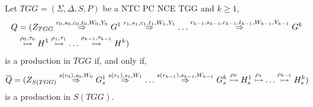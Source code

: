 \begin{theorem}
	\label{thm:one_d_enough_pac}
	Let $TGG = (\Sigma, \Delta, S, P)$ be a NTC PC NCE TGG and $k \ge 1$,
	\begin{align*}
		Q & = (\startTG{TGG} \tderivpac{r_0}{s_0,c_0,t_0}{W_0,Y_0}{} G^1 \tderivpac{r_1}{s_1,c_1,t_1}{W_1,Y_1}{} \dots \tderivpac{r_{k-1}}{s_{k-1},c_{k-1},t_{k-1}}{W_{k-1},Y_{k-1}}{} G^k \\
		& \tresolv{\rho_0,\tau_0} H^1 \tresolv{\rho_1,\tau_1} \dots \tresolv{\rho_{k-1},\tau_{k-1}} H^k)
	\end{align*}
	is a production in $TGG$ if, and only if,
	\begin{equation*}
		\overline{Q} = (\startG{S(TGG)} \derivpac{s(r_0)}{s_0}{W_0}{} G^1_s \derivpac{s(r_1)}{s_1}{W_1}{} \dots \derivpac{s(r_{k-1})}{s_{k-1}}{W_{k-1}}{} G^k_s \tresolv{\rho_0} H_s^1 \tresolv{\rho_1} \dots \tresolv{\rho_{k-1}} H_s^k)
	\end{equation*}
	is a production in $S(TGG)$.
\end{theorem}
